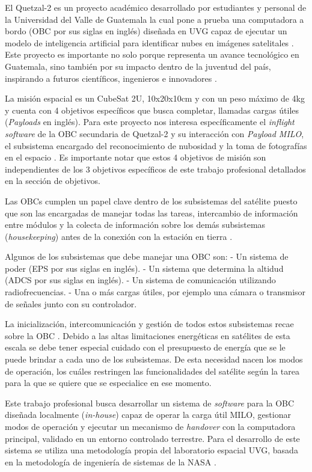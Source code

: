 El Quetzal-2 es un proyecto académico desarrollado por estudiantes y personal de la Universidad del Valle de Guatemala la cual pone a prueba una computadora a bordo (OBC por sus siglas en inglés) diseñada en UVG capaz de ejecutar un modelo de inteligencia artificial para identificar nubes en imágenes satelitales \cite{quetzal_2}. Este proyecto es importante no solo porque representa un avance tecnológico en Guatemala, sino también por su impacto dentro de la juventud del país, inspirando a futuros científicos, ingenieros e innovadores \cite{quetzal_1}.

La misión espacial es un CubeSat 2U, 10x20x10cm y con un peso máximo de 4kg \cite{cubesat_2022} y cuenta con 4 objetivos específicos que busca completar, llamadas cargas útiles (\textit{Payloads} en inglés). Para este proyecto nos interesa específicamente el \textit{inflight software} de la OBC secundaria de Quetzal-2 y su interacción con \textit{Payload MILO}, el subsistema encargado del reconocimiento de nubosidad y la toma de fotografías en el espacio \cite{quetzal_2}. Es importante notar que estos 4 objetivos de misión son independientes de los 3 objetivos específicos de este trabajo profesional detallados en la sección de objetivos.

Las OBCs cumplen un papel clave dentro de los subsistemas del satélite puesto que son las encargadas de manejar todas las tareas, intercambio de información entre módulos y la colecta de información sobre los demás subsistemas (\textit{housekeeping}) antes de la conexión con la estación en tierra \cite{lwabanji_wilkinson_biermann_bellville_2013}.

Algunos de los subsistemas que debe manejar una OBC son:
  - Un sistema de poder (EPS por sus siglas en inglés).
  - Un sistema que determina la altidud (ADCS por sus siglas en inglés).
  - Un sistema de comunicación utilizando radiofrecuencias.
  - Una o más cargas útiles, por ejemplo una cámara o transmisor de señales junto con su controlador.

La inicialización, intercomunicación y gestión de todos estos subsistemas recae sobre la OBC \cite{akhtar_2012}. Debido a las altas limitaciones energéticas en satélites de esta escala se debe tener especial cuidado con el presupuesto de energía que se le puede brindar a cada uno de los subsistemas. De esta necesidad nacen los modos de operación, los cuáles restringen las funcionalidades del satélite según la tarea para la que se quiere que se especialice en ese momento.

Este trabajo profesional busca desarrollar un sistema de \textit{software} para la OBC diseñada localmente (\textit{in-house}) capaz de operar la carga útil MILO, gestionar modos de operación y ejecutar un mecanismo de \textit{handover} con la computadora principal, validado en un entorno controlado terrestre. Para el desarrollo de este sistema se utiliza una metodología propia del laboratorio espacial UVG, basada en la metodología de ingeniería de sistemas de la NASA \cite{nasa_systems_engineering}.
